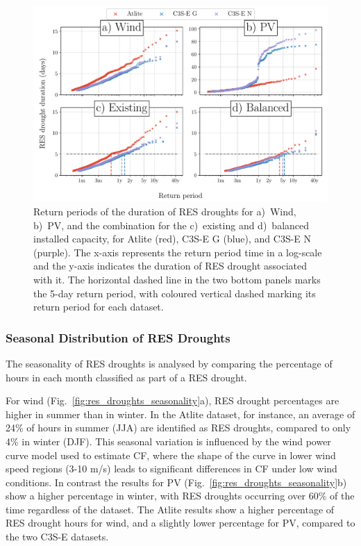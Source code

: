\documentclass[a4paper, 11pt]{article}
\begin{document}
\begin{figure}[!ht]
	\centering
	\includegraphics[width=\textwidth]{droughts_return_periods}
	\caption{Return periods of the duration of RES droughts for a)~Wind, b)~PV, and the combination for the c)~existing and d)~balanced installed capacity, for Atlite (red), C3S-E G (blue), and C3S-E N (purple). The x-axis represents the return period time in a log-scale and the y-axis indicates the duration of RES drought associated with it. The horizontal dashed line in the two bottom panels marks the 5-day return period, with coloured vertical dashed marking its return period for each dataset.}
	\label{fig:return_periods}
\end{figure}

\newpage
\subsubsection{Seasonal Distribution of RES Droughts}

The seasonality of RES droughts is analysed by comparing the percentage of hours in each month classified as part of a RES drought. 

For wind (Fig.~\ref{fig:res_droughts_seasonality}a), RES drought percentages are higher in summer than in winter. In the Atlite dataset, for instance, an average of 24\% of hours in summer (JJA) are identified as RES droughts, compared to only 4\% in winter (DJF). This seasonal variation is influenced by the wind power curve model used to estimate CF, where the shape of the curve in lower wind speed regions (3-10 m/s) leads to significant differences in CF under low wind conditions. In contrast the results for PV (Fig.~\ref{fig:res_droughts_seasonality}b) show a higher percentage in winter, with RES droughts occurring over 60\% of the time regardless of the dataset. The Atlite results show a higher percentage of RES drought hours for wind, and a slightly lower percentage for PV, compared to the two C3S-E datasets. 
\end{document}
